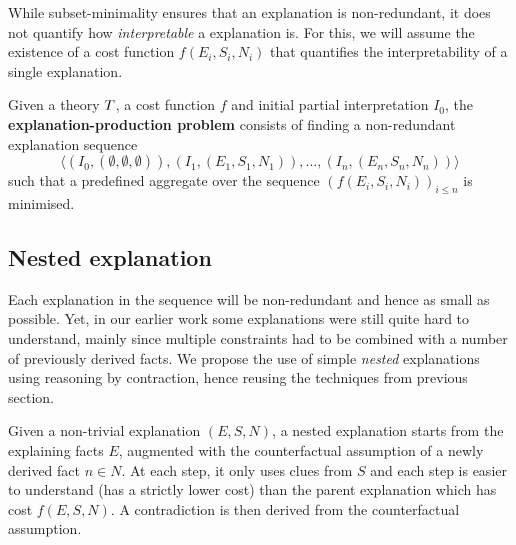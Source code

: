 While subset-minimality ensures that an explanation is non-redundant, it does not quantify how \textit{interpretable} a explanation is.
For this, we will assume the existence of a cost function $f(E_i,S_i,N_i)$ that quantifies the interpretability of a single explanation.

Given a theory $T$, a cost function $f$ and initial partial interpretation $I_0$, the \textbf{explanation-production problem} consists of finding a non-redundant explanation sequence
\[\langle(I_0,(\emptyset,\emptyset,\emptyset)), (I_1,(E_1,S_1,N_1)), \dots ,(I_n,(E_n,S_n,N_n))\rangle\]
such that a predefined aggregate over the sequence $\left(f(E_i,S_i,N_i)\right)_{i\leq n}$ is minimised.

\subsection{Nested explanation}
Each explanation in the sequence will be non-redundant and hence as small as possible. Yet, in our earlier work some explanations were still quite hard to understand, mainly since multiple constraints had to be combined with a number of previously derived facts. 
We propose the use of simple \textit{nested} explanations using reasoning by contraction, hence reusing the techniques from previous section. 

Given a non-trivial explanation $(E,S,N)$, a nested explanation starts from the explaining facts $E$, augmented with the counterfactual assumption of a newly derived fact $n \in N$. At each step, it only uses clues from $S$ and each step is easier to understand (has a strictly lower cost) than the parent explanation which has cost $f(E,S,N)$. A contradiction is then derived from the counterfactual assumption.

